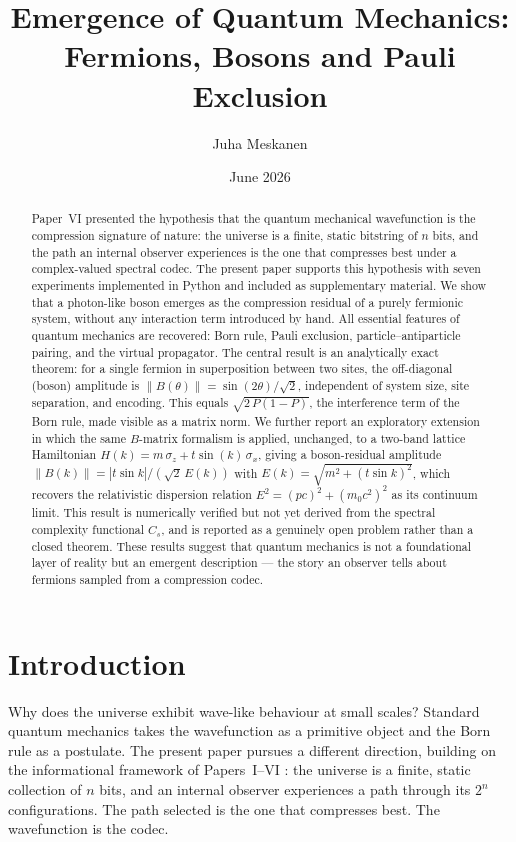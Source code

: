 \documentclass[11pt]{article}
\title{Emergence of Quantum Mechanics: Fermions, Bosons and Pauli Exclusion}
\author{Juha Meskanen}
\date{June 2026}
\begin{document}
\maketitle

\begin{abstract}
Paper~VI \cite{meskanen2026v} presented the hypothesis that the quantum mechanical
wavefunction is the compression signature of nature: the universe is a finite,
static bitstring of $n$ bits, and the path an internal observer experiences is the
one that compresses best under a complex-valued spectral codec.
The present paper supports this hypothesis with seven experiments implemented in Python
and included as supplementary material.
We show that a photon-like boson emerges as the compression residual of a purely
fermionic system, without any interaction term introduced by hand.
All essential features of quantum mechanics are recovered: Born rule, Pauli
exclusion, particle--antiparticle pairing, and the virtual propagator.
The central result is an analytically exact theorem:
for a single fermion in superposition between two sites, the off-diagonal
(boson) amplitude is $\|B(\theta)\| = \sin(2\theta)/\sqrt{2}$, independent of
system size, site separation, and encoding.
This equals $\sqrt{2\,P(1-P)}$, the interference term of the Born rule, made
visible as a matrix norm.
We further report an exploratory extension in which the same $B$-matrix
formalism is applied, unchanged, to a two-band lattice Hamiltonian
$H(k) = m\,\sigma_z + t\sin(k)\,\sigma_x$, giving a boson-residual amplitude
$\|B(k)\| = |t\sin k|/(\sqrt{2}\,E(k))$ with $E(k)=\sqrt{m^2+(t\sin k)^2}$,
which recovers the relativistic dispersion relation
$E^2 = (pc)^2 + (m_0c^2)^2$ as its continuum limit.
This result is numerically verified but not yet derived from the spectral
complexity functional $C_s$, and is reported as a genuinely open problem
rather than a closed theorem.
These results suggest that quantum mechanics is not a foundational layer of
reality but an emergent description --- the story an observer tells about
fermions sampled from a compression codec.
\end{abstract}

\tableofcontents
\newpage

\section{Introduction}
\label{sec:intro}

Why does the universe exhibit wave-like behaviour at small scales?
Standard quantum mechanics takes the wavefunction as a primitive object and
the Born rule as a postulate.
The present paper pursues a different direction, building on the informational
framework of Papers~I--VI \cite{meskanen2001, meskanen2002, meskanen2003, meskanen2026iv, meskanen2026v, meskanen2026vi}:
the universe is a finite, static collection of $n$
bits, and an internal observer experiences a path through its $2^n$ configurations.
The path selected is the one that compresses best.
The wavefunction is the codec.
\end{document}
